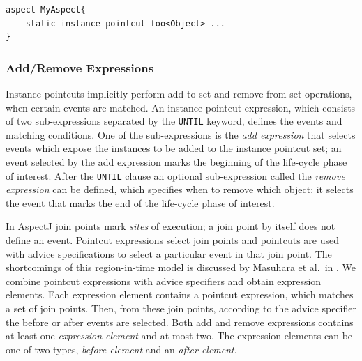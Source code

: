 \documentclass{acm_proc_article-sp}
\begin{document}
\begin{lstlisting}[float=h!, caption={An instance pointcut declaration in an aspect}, label={lst:member}]
aspect MyAspect{
	static instance pointcut foo<Object> ...
}
\end{lstlisting}

\subsubsection{Add/Remove Expressions}
Instance pointcuts implicitly perform add to set and remove from set operations, when certain events are matched. An instance pointcut expression, which consists of two sub-expressions separated by the \texttt{UNTIL} keyword,  defines the events and matching conditions. One of the sub-expressions is the \emph{add expression} that selects events which expose the instances to be added to the instance pointcut set; an event selected by the add expression marks the beginning of the life-cycle phase of interest. After the \texttt{UNTIL} clause an optional sub-expression called the \emph{remove expression} can be defined,  which specifies when to remove which object: it selects the event that marks the end of the life-cycle phase of interest. 

 
In AspectJ join points mark \emph{sites} of execution; a join point by itself does not define an event. 
Pointcut expressions select join points and pointcuts are used with advice specifications to select a particular event in that join point. The shortcomings of this region-in-time model is discussed by Masuhara et al.\ in \cite{masuharafine}.
We combine pointcut expressions with advice specifiers and obtain expression elements. Each expression element contains a pointcut expression, which matches a set of join points. Then, from these join points, according to the advice specifier the before or after events are selected.
Both add and remove expressions contains at least one \emph{expression element} and at most two.
The expression elements can be one of two types, \emph{before element} and an \emph{after element}.
\end{document}

